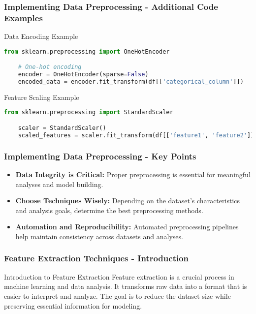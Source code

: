 \documentclass[aspectratio=169]{beamer}
\begin{document}
\begin{frame}[fragile]
    \frametitle{Implementing Data Preprocessing - Additional Code Examples}
    \begin{block}{Data Encoding Example}
    \begin{lstlisting}[language=Python]
    from sklearn.preprocessing import OneHotEncoder

    # One-hot encoding
    encoder = OneHotEncoder(sparse=False)
    encoded_data = encoder.fit_transform(df[['categorical_column']])
    \end{lstlisting}
    \end{block}

    \begin{block}{Feature Scaling Example}
    \begin{lstlisting}[language=Python]
    from sklearn.preprocessing import StandardScaler

    scaler = StandardScaler()
    scaled_features = scaler.fit_transform(df[['feature1', 'feature2']])
    \end{lstlisting}
    \end{block}
\end{frame}

\begin{frame}
    \frametitle{Implementing Data Preprocessing - Key Points}
    \begin{itemize}
        \item \textbf{Data Integrity is Critical:} Proper preprocessing is essential for meaningful analyses and model building.
        \item \textbf{Choose Techniques Wisely:} Depending on the dataset’s characteristics and analysis goals, determine the best preprocessing methods.
        \item \textbf{Automation and Reproducibility:} Automated preprocessing pipelines help maintain consistency across datasets and analyses.
    \end{itemize}
\end{frame}

\begin{frame}[fragile]
    \frametitle{Feature Extraction Techniques - Introduction}
    \begin{block}{Introduction to Feature Extraction}
        Feature extraction is a crucial process in machine learning and data analysis. It transforms raw data into a format that is easier to interpret and analyze. The goal is to reduce the dataset size while preserving essential information for modeling.
    \end{block}
\end{frame}
\end{document}
